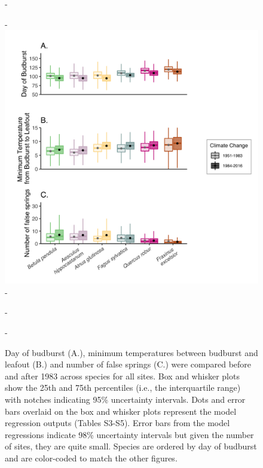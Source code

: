 \documentclass{article}\usepackage[]{graphicx}\usepackage[]{color}
\begin{document}
{\begin{figure} [H]
  -\begin{center}
  -\includegraphics[width=14cm]{..//analyses/figures/Boxplot_BBTminFS_noDots_modests.png}
  -\caption{Day of budburst (A.), minimum temperatures between budburst and leafout (B.) and number of false springs (C.) were compared before and after 1983 across species for all sites. Box and whisker plots show the 25th and 75th percentiles (i.e., the interquartile range) with notches indicating 95\% uncertainty intervals. Dots and error bars overlaid on the box and whisker plots represent the model regression outputs (Tables S3-S5). Error bars from the model regressions indicate 98\% uncertainty intervals but given the number of sites, they are quite small. Species are ordered by day of budburst and are color-coded to match the other figures.  }\label{fig:boxfs}
  -\end{center}
  -\end{figure}}
  
\end{document}
